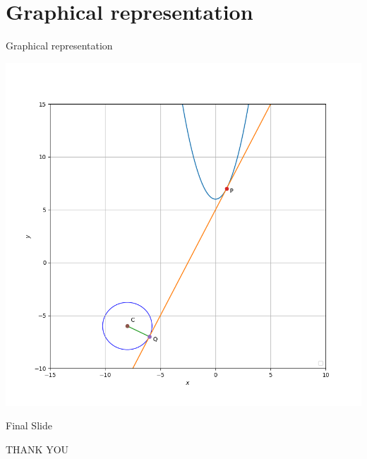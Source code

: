 \documentclass{beamer}
\begin{document}
\section{Graphical representation}

\begin{frame}{Graphical representation}
\begin{center}
   \includegraphics[scale =0.35]{Fig1.png} 
\end{center}

 
\end{frame}

\begin{frame}{Final Slide}
\begin{center}
    THANK YOU
\end{center}
    
\end{frame}
    
\end{document}
